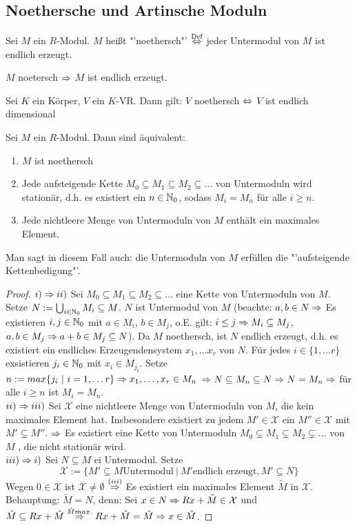 \subsection{Noethersche und Artinsche Moduln}
\begin{df}
	Sei $M$ ein $R$-Modul. $M$ heißt "'noethersch"' $\overset{\text{Def}}{\Leftrightarrow}$ jeder Untermodul von $M$ ist endlich erzeugt.
\end{df}
\begin{anm}
	$M$ noetersch $\Rightarrow $ $M$ ist endlich erzeugt.
\end{anm}
\begin{bsp}
	Sei $K$ ein Körper, $V$ ein $K$-VR. Dann gilt: $V$ noethersch $\Leftrightarrow$ $V$ ist endlich dimensional
\end{bsp}
\begin{sa}
	Sei $M$ ein $R$-Modul. Dann sind äquivalent:
	\begin{enumerate}[label= \roman*)]
		\item $M$ ist noethersch
		\item Jede aufsteigende Kette $M_0 \subseteq M_1 \subseteq M_2 \subseteq \dots $ von Untermoduln wird stationär, d.h. es existiert ein $ n \in \mathbb{N}_0$, sodass $M_i = M_n$ für alle $i \geq n $.
		\item Jede nichtleere Menge von Untermoduln von $M$ enthält ein maximales Element.
	\end{enumerate}
	Man sagt in diesem Fall auch: die Untermoduln von $M$ erfüllen die "'aufsteigende Kettenbedigung"'.
\end{sa}
	\begin{proof} 
		$i) \Rightarrow ii)$ Sei $M_0 \subseteq M_1 \subseteq M_2 \subseteq \dots $ eine Kette von Untermoduln von $M$. Setze $N := \bigcup_{i \in \mathbb{N}_0} M_i \subseteq M$. $N$ ist Untermodul von $M$ (beachte: $ a,b \in N \Rightarrow $ Es existieren $i,j \in \mathbb{N}_0$ mit $a \in M_i$, $b \in M_j$, o.E. gilt: $i\leq j \Rightarrow M_i \subseteq M_j$, $a,b \in M_j \Rightarrow a+b \in M_j \subseteq N$). Da $M$ noethersch, ist $N$ endlich erzeugt, d.h. es existiert ein endliches Erzeugendensystem $x_1, \dots x_r$ von $N$. Für jedes $i \in \{1,\dots r\} $ exsistieren $j_i \in \mathbb{N}_0 $ mit $x_i \in M_{j_i}$. Setze $n:= max\{j_i \ | \ i = 1, \dots r \} \Rightarrow x_1,\dots, x_r \in M_n$ $ \Rightarrow N \subseteq M_n \subseteq N \Rightarrow N = M_n \Rightarrow $ für alle $i \geq n $ ist $ M _i=M_n$.\\
		$ii) \Rightarrow iii)$ Sei $\mathcal{X}$ eine nichtleere Menge von Untermoduln von $M$, die kein maximales Element hat. Insbesondere existiert zu jedem $ M' \in \mathcal{X} $ ein $M'' \in \mathcal{X} $ mit $M' \subsetneq M''$. $\Rightarrow$ Es existiert eine Kette von Untermoduln $M_0 \subsetneq M_1 \subsetneq M_2 \subsetneq \dots $ von $M$ , die nicht stationär wird.\\
		$iii) \Rightarrow i)$ Sei $N \subseteq M $ ei Untermodul. Setze $$\mathcal{X} := \{M' \subseteq M \text {Untermodul} \ | \ M' \text{endlich erzeugt}, M' \subseteq N\}$$Wegen $0 \in \mathcal{X}$ ist $\mathcal{X} \neq \emptyset $ $\overset{(iii)}{\Rightarrow}$ Es existiert ein maximales Element $\tilde{M} $ in $\mathcal{X}$. \\
		Behauptung: $\tilde{M} = N$, denn: Sei $ x \in N \Rightarrow Rx+\tilde{M} \in \mathcal{X} $ und $ \tilde{M} \subseteq Rx+\tilde{M} \overset{\tilde{M} max.}{\Rightarrow} Rx+\tilde{M} = \tilde{M} \Rightarrow x \in \tilde{M}$.
	\end{proof}

